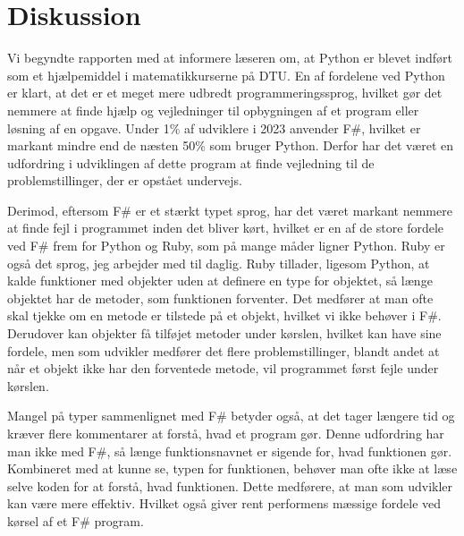 \documentclass{article}
\begin{document}

\tableofcontents
\newpage



\newpage

\newpage

\newpage


\newpage

\newpage


\section{Diskussion}
Vi begyndte rapporten med at informere læseren om, at Python er blevet indført som et hjælpemiddel i matematikkurserne på DTU. En af fordelene ved Python er klart, at det er et meget mere udbredt programmeringssprog, hvilket gør det nemmere at finde hjælp og vejledninger til opbygningen af et program eller løsning af en opgave. Under 1\% af udviklere i 2023 anvender F\#, hvilket er markant mindre end de næsten 50\% som bruger Python. Derfor har det været en udfordring i udviklingen af dette program at finde vejledning til de problemstillinger, der er opstået undervejs.

Derimod, eftersom F\# er et stærkt typet sprog, har det været markant nemmere at finde fejl i programmet inden det bliver kørt, hvilket er en af de store fordele ved F\# frem for Python og Ruby, som på mange måder ligner Python. Ruby er også det sprog, jeg arbejder med til daglig. Ruby tillader, ligesom Python, at kalde funktioner med objekter uden at definere en type for objektet, så længe objektet har de metoder, som funktionen forventer. Det medfører at man ofte skal tjekke om en metode er tilstede på et objekt, hvilket vi ikke behøver i F\#. Derudover kan objekter få tilføjet metoder under kørslen, hvilket kan have sine fordele, men som udvikler medfører det flere problemstillinger, blandt andet at når et objekt ikke har den forventede metode, vil programmet først fejle under kørslen. 

Mangel på typer sammenlignet med F\# betyder også, at det tager længere tid og kræver flere kommentarer at forstå, hvad et program gør. Denne udfordring har man ikke med F\#, så længe funktionsnavnet er sigende for, hvad funktionen gør. Kombineret med at kunne se, typen for funktionen, behøver man ofte ikke at læse selve koden for at forstå, hvad funktionen. Dette medførere, at man som udvikler kan være mere effektiv. Hvilket også giver rent performens mæssige fordele ved kørsel af et F\# program. 
\end{document}
